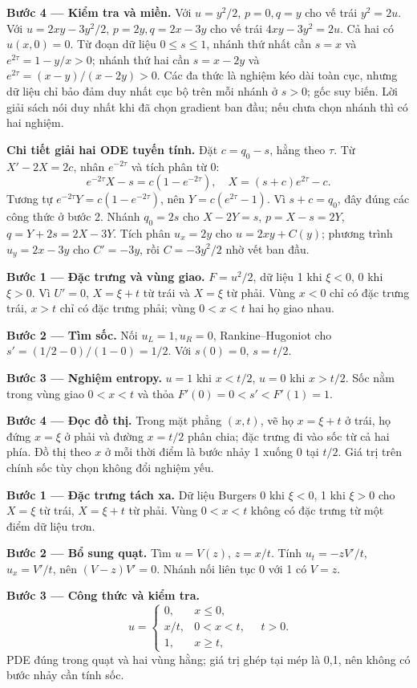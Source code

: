 \textbf{Bước 4 — Kiểm tra và miền.} Với $u=y^2/2$, $p=0,q=y$ cho vế trái $y^2=2u$. Với $u=2xy-3y^2/2$, $p=2y,q=2x-3y$ cho vế trái $4xy-3y^2=2u$. Cả hai có $u(x,0)=0$. Từ đoạn dữ liệu $0\le s\le1$, nhánh thứ nhất cần $s=x$ và $e^{2\tau}=1-y/x>0$; nhánh thứ hai cần $s=x-2y$ và $e^{2\tau}=(x-y)/(x-2y)>0$. Các đa thức là nghiệm kéo dài toàn cục, nhưng dữ liệu chỉ bảo đảm duy nhất cục bộ trên mỗi nhánh ở $s>0$; gốc suy biến. Lời giải sách nói duy nhất khi đã chọn gradient ban đầu; nếu chưa chọn nhánh thì có hai nghiệm.

\textbf{Chi tiết giải hai ODE tuyến tính.} Đặt $c=q_0-s$, hằng theo $\tau$. Từ $X'-2X=2c$, nhân $e^{-2\tau}$ và tích phân từ $0$:
\[e^{-2\tau}X-s=c(1-e^{-2\tau}),\quad X=(s+c)e^{2\tau}-c.\]
Tương tự $e^{-2\tau}Y=c(1-e^{-2\tau})$, nên $Y=c(e^{2\tau}-1)$. Vì $s+c=q_0$, đây đúng các công thức ở bước 2. Nhánh $q_0=2s$ cho $X-2Y=s$, $p=X-s=2Y$, $q=Y+2s=2X-3Y$. Tích phân $u_x=2y$ cho $u=2xy+C(y)$; phương trình $u_y=2x-3y$ cho $C'=-3y$, rồi $C=-3y^2/2$ nhờ vết ban đầu.

\textbf{Bước 1 — Đặc trưng và vùng giao.} $F=u^2/2$, dữ liệu 1 khi $\xi<0$, 0 khi $\xi>0$. Vì $U'=0$, $X=\xi+t$ từ trái và $X=\xi$ từ phải. Vùng $x<0$ chỉ có đặc trưng trái, $x>t$ chỉ có đặc trưng phải; vùng $0<x<t$ hai họ giao nhau.

\textbf{Bước 2 — Tìm sốc.} Nối $u_L=1,u_R=0$, Rankine–Hugoniot cho $s'=(1/2-0)/(1-0)=1/2$. Với $s(0)=0$, $s=t/2$.

\textbf{Bước 3 — Nghiệm entropy.} $u=1$ khi $x<t/2$, $u=0$ khi $x>t/2$. Sốc nằm trong vùng giao $0<x<t$ và thỏa $F'(0)=0<s'<F'(1)=1$.

\textbf{Bước 4 — Đọc đồ thị.} Trong mặt phẳng $(x,t)$, vẽ họ $x=\xi+t$ ở trái, họ đứng $x=\xi$ ở phải và đường $x=t/2$ phân chia; đặc trưng đi vào sốc từ cả hai phía. Đồ thị theo $x$ ở mỗi thời điểm là bước nhảy 1 xuống 0 tại $t/2$. Giá trị trên chính sốc tùy chọn không đổi nghiệm yếu.

\textbf{Bước 1 — Đặc trưng tách xa.} Dữ liệu Burgers 0 khi $\xi<0$, 1 khi $\xi>0$ cho $X=\xi$ từ trái, $X=\xi+t$ từ phải. Vùng $0<x<t$ không có đặc trưng từ một điểm dữ liệu trơn.

\textbf{Bước 2 — Bổ sung quạt.} Tìm $u=V(z)$, $z=x/t$. Tính $u_t=-zV'/t$, $u_x=V'/t$, nên $(V-z)V'=0$. Nhánh nối liên tục 0 với 1 có $V=z$.

\textbf{Bước 3 — Công thức và kiểm tra.}
\[u=\begin{cases}0,&x\le0,\\x/t,&0<x<t,\\1,&x\ge t,\end{cases}\quad t>0.\]
PDE đúng trong quạt và hai vùng hằng; giá trị ghép tại mép là 0,1, nên không có bước nhảy cần tính sốc.

